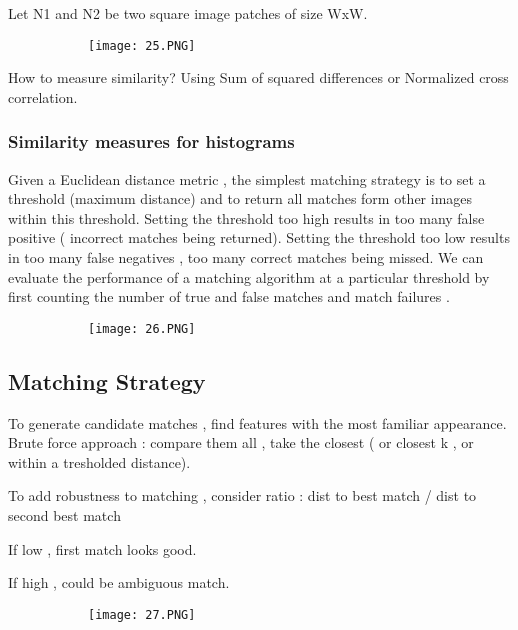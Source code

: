 \documentclass{article}
\begin{document}
Let N1 and N2 be two square image patches of size WxW.

\begin{figure}[ht!]
  \centering
  \begin{subfigure}[b]{0.7\linewidth}
    \texttt{[image: 25.PNG]}
  \end{subfigure}
\end{figure}

How to measure similarity? Using Sum of squared differences or Normalized cross correlation.

\subsubsection{Similarity measures for histograms}

Given a Euclidean distance metric , the simplest matching strategy is to set a threshold (maximum distance) and to return all matches form other images within this threshold. Setting the threshold too high results in too many false positive ( incorrect matches being returned). Setting the threshold too low results in too many false negatives , too many correct matches being missed. We can evaluate the performance of a matching algorithm at a particular threshold by  first counting the number of true and false matches and match failures .

\begin{figure}[ht!]
  \centering
  \begin{subfigure}[b]{0.5\linewidth}
    \texttt{[image: 26.PNG]}
  \end{subfigure}
\end{figure}

\subsection{Matching Strategy}

To generate candidate matches , find features with the most familiar appearance. Brute force approach : compare them all , take the closest ( or closest k , or within a tresholded distance).

To add robustness to matching , consider ratio : dist to best match / dist to second best match

If low , first match looks good.

If high , could be ambiguous match.

\begin{figure}[ht!]
  \centering
  \begin{subfigure}[b]{0.5\linewidth}
    \texttt{[image: 27.PNG]}
  \end{subfigure}
\end{figure}
\end{document}
